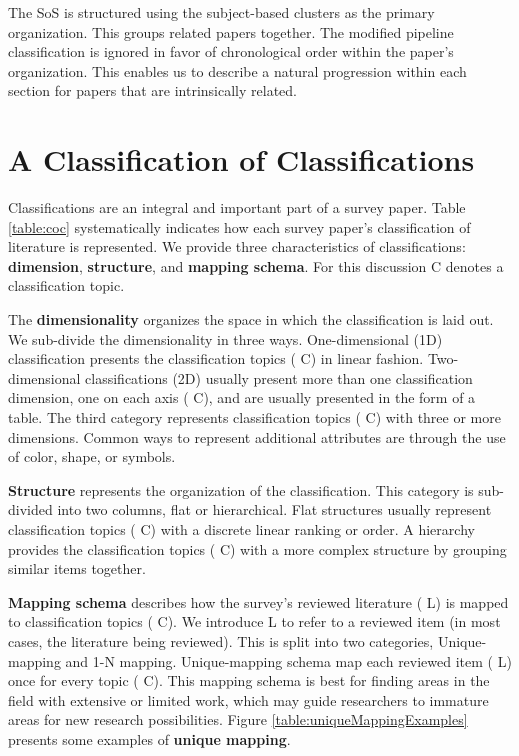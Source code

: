 The SoS is structured using the subject-based clusters as the primary organization. This groups related papers together. The modified pipeline classification is ignored in favor of chronological order within the paper's organization. This enables us to describe a natural progression within each section for papers that are intrinsically related. 


\section{A Classification of Classifications}

Classifications are an integral and important part of a survey paper. Table \ref{table:coc} systematically indicates how each survey paper's classification of literature is represented.
We provide three characteristics of classifications: \textbf{dimension}, \textbf{structure}, and \textbf{mapping schema}. For this discussion {\color{red} C} denotes a classification topic.

The \textbf{dimensionality} organizes the space in which the classification is laid out. We sub-divide the dimensionality in three ways. One-dimensional (1D) classification presents the classification topics ({\color{red} C}) in linear fashion. Two-dimensional classifications (2D) usually present more than one classification dimension, one on each axis ({\color{red} C}), and are usually presented in the form of a table. The third category represents classification topics ({\color{red} C}) with three or more dimensions. Common ways to represent additional attributes are through the use of  color, shape, or symbols.

\textbf{Structure }represents the organization of the classification. This category is sub-divided into two columns, flat or hierarchical. Flat structures usually represent classification topics ({\color{red} C}) with a discrete linear ranking or order. A hierarchy provides the classification topics ({\color{red} C}) with a more complex structure by grouping similar items together.

\textbf{Mapping schema} describes how the survey's reviewed literature ({\color{blue} L}) is mapped to classification topics ({\color{red} C}). We introduce {\color{blue} L} to refer to a reviewed item (in most cases, the literature being reviewed). This is split into two categories, Unique-mapping and 1-N mapping. Unique-mapping schema map each reviewed item ({\color{blue} L}) once for every topic ({\color{red} C}). This mapping schema is best for finding areas in the field with extensive or limited work, which may guide researchers to immature areas for new research possibilities. Figure \ref{table:uniqueMappingExamples} presents some examples of \textbf{unique mapping}.


